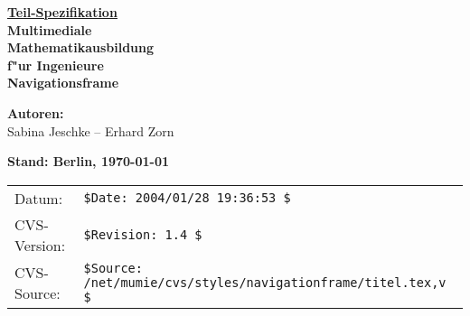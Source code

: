 
\pagestyle{empty}

\phantom{a}
\vspace{30mm}

\begin{center}
\underline{\underline{\Huge\bf Teil-Spezifikation}}\\[15mm]
{\Large\bf Multimediale}\\[2ex]
{\Large\bf Mathematikausbildung}\\[2ex]
{\Large\bf f"ur Ingenieure}\\[14ex]
{\Large\bf Navigationsframe}
\item \end{center}

\vspace{32mm}

\vspace{5mm}
\begin{center}
{\large \textbf{Autoren:}}\\[2.5ex] 
{\large Sabina Jeschke -- Erhard Zorn}
\end{center}


\vspace{10mm}

\begin{center}
{\large\bf Stand: Berlin, \today}
\end{center}

\begin{tabular}{ll}
\textsf{Datum:}&\verb+$Date: 2004/01/28 19:36:53 $+\\ %
\textsf{CVS-Version:}&\verb+$Revision: 1.4 $+\\ %
\textsf{CVS-Source:}&\verb+$Source: /net/mumie/cvs/styles/navigationframe/titel.tex,v $+\\ %
\end{tabular}

\newpage

\phantom{was auch immer...}

\setcounter{page}{0}

\clearpage

\pagestyle{plain}




